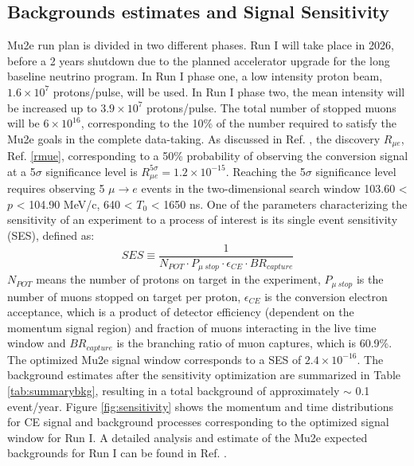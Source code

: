 \subsection{Backgrounds estimates and Signal Sensitivity}
Mu2e run plan is divided in two different phases. Run I will take place in 2026, before a 2 years shutdown due to the planned accelerator upgrade for the long baseline neutrino program. In Run I phase one, a low intensity proton beam, $1.6 \times 10^7$ protons/pulse, will be used. In Run I phase two, the mean intensity will be increased up to $3.9 \times 10^7$ protons/pulse. The total number of stopped muons will be $6 \times 10^{16}$, corresponding to the 10\% of the number required to satisfy the Mu2e goals in the complete data-taking. As discussed in Ref. \cite{universe9010054}, the discovery $R_{\mu e}$, Ref. \ref{rmue}, corresponding to a 50\% probability of observing the conversion signal at a 5$\sigma$ significance level is $R_{\mu e}^{5 \sigma}= 1.2 \times 10^{-15} $. Reaching the 5$\sigma$ significance level requires observing 5 $\mu\rightarrow e$ events in the two-dimensional search window 103.60 < $p$ < 104.90 MeV/c, 640 < $T_0$ < 1650 ns. One of the
parameters characterizing the sensitivity of an experiment to a process of interest is its
single event sensitivity (SES), defined as:
\begin{equation}
    SES \equiv \frac{1}{N_{POT} \cdot P_{\mu \ stop} \cdot \epsilon_{CE} \cdot BR_{capture}}
\end{equation} 
$N_{POT}$ means the number of protons on target in the experiment, $P_{\mu \ stop}$ is the number of muons stopped on target per proton, $\epsilon_{CE}$ is the conversion electron acceptance, which is a product of detector efficiency (dependent on the momentum signal region) and fraction of muons interacting in the live time window and $BR_{capture}$ is the branching ratio of muon captures, which is 60.9\%. The optimized Mu2e signal window corresponds to a SES of $2.4 \times 10^{-16}$. The background estimates after the sensitivity optimization are summarized in Table \ref{tab:summarybkg}, resulting in a total background of approximately $\sim$ 0.1 event/year. Figure \ref{fig:sensitivity} shows the momentum and time distributions for CE signal and background processes corresponding to the optimized signal window for Run I. A detailed analysis and estimate of the Mu2e expected backgrounds for Run I can be found in Ref. \cite{universe9010054}.
